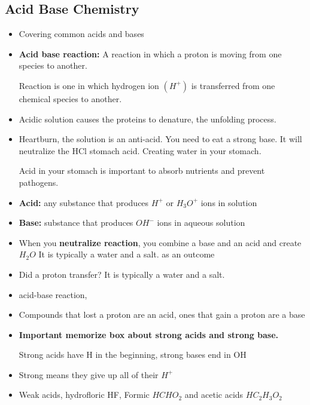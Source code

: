 \documentclass{article}
\begin{document}
\subsection{Acid Base Chemistry}
\begin{itemize}
  \item Covering common acids and bases
  \item \textbf{Acid base reaction:} A reaction in which a proton is moving from one species to another.

    Reaction is one in which hydrogen ion $(H^+)$ is transferred from one chemical species to another.
  \item Acidic solution causes the proteins to denature, the unfolding process.
  \item Heartburn, the solution is an anti-acid. You need to eat a strong base. It will neutralize the HCl stomach
    acid. Creating water in your stomach.

    Acid in your stomach is important to absorb nutrients and prevent pathogens.
  \item \textbf{Acid:} any substance that produces $H^+$ or $H_3O^+ $ ions in solution
  \item \textbf{Base:} substance that produces $OH^-$ ions in aqueous solution
  \item When you \textbf{neutralize reaction}, you combine a base and an acid and create $H_2O$
    It is typically a water and a salt. as an outcome
  \item Did a proton transfer? It is typically a water and a salt.
  \item acid-base reaction,
  \item Compounds that lost a proton are an acid, ones that gain a proton are a base
  \item \textbf{Important memorize box about strong acids and strong base.}

    Strong acids have H in the beginning, strong bases end in OH
  \item Strong means they give up all of their $H^+$
  \item Weak acids, hydrofloric HF, Formic $HCHO_2$ and acetic acids $HC_2H_3O_2$
\end{itemize}
\end{document}
